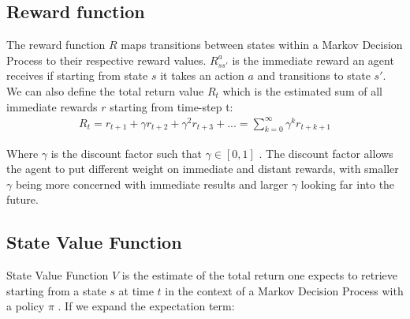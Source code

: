 \subsection{Reward function}
The reward function $R$ maps transitions between states within a
Markov Decision Process to their respective reward values.
$R_{ss'}^{a}$ is the immediate reward an agent receives if starting from state $s$ it takes an action $a$ and transitions to state $s'$.\\

We can also define the total return value $R_t$ which is the estimated sum of all immediate rewards $r$ starting from time-step t:
\begin{align}
    R_t = r_{t+1} + \gamma r_{t+2} + \gamma ^2 r_{t+3} + ... = \sum^{\infty}_{k=0}\gamma^{k}r_{t+k+1} \label{eq:return}
\end{align}

Where $\gamma$ is the discount factor such that $\gamma \in [0, 1]$ \cite{lecture_lets_go_markov}. The discount factor allows the agent to put different weight on immediate and distant rewards, with smaller $\gamma$ being more concerned with immediate results and larger $\gamma$ looking far into the future. 



\subsection{State Value Function}
State Value Function $V$ is the estimate of the total return one expects to retrieve starting from a state $s$ at time $t$ in the context of a Markov Decision Process with a policy $\pi$ \cite{lecture_lets_go_markov}. If we expand the expectation term:
%      

